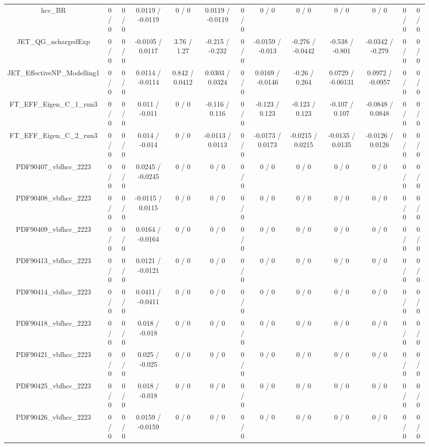 \documentclass[10pt]{article}
\begin{document}
\begin{table}[htbp]
\begin{center}
\begin{tabular}{|c|c|c|c|c|c|c|c|c|c|c|c|c|}
  hcc_BR & 0 / 0 & 0 / 0 & 0.0119 / -0.0119 & 0 / 0 & 0.0119 / -0.0119 & 0 / 0 & 0 / 0 & 0 / 0 & 0 / 0 & 0 / 0 & 0 / 0 & 0 / 0 \\ 
  JET_QG_nchargedExp & 0 / 0 & 0 / 0 & -0.0105 / 0.0117 & 3.76 / 1.27 & -0.215 / -0.232 & 0 / 0 & -0.0159 / -0.013 & -0.276 / -0.0442 & -0.538 / -0.801 & -0.0342 / -0.279 & 0 / 0 & 0 / 0 \\ 
  JET_EffectiveNP_Modelling1 & 0 / 0 & 0 / 0 & 0.0114 / -0.0114 & 0.842 / 0.0412 & 0.0303 / 0.0324 & 0 / 0 & 0.0169 / -0.0146 & -0.26 / 0.264 & 0.0729 / -0.00131 & 0.0972 / -0.0957 & 0 / 0 & 0 / 0 \\ 
  FT_EFF_Eigen_C_1_run3 & 0 / 0 & 0 / 0 & 0.011 / -0.011 & 0 / 0 & -0.116 / 0.116 & 0 / 0 & -0.123 / 0.123 & -0.123 / 0.123 & -0.107 / 0.107 & -0.0848 / 0.0848 & 0 / 0 & 0 / 0 \\ 
  FT_EFF_Eigen_C_2_run3 & 0 / 0 & 0 / 0 & 0.014 / -0.014 & 0 / 0 & -0.0113 / 0.0113 & 0 / 0 & -0.0173 / 0.0173 & -0.0215 / 0.0215 & -0.0135 / 0.0135 & -0.0126 / 0.0126 & 0 / 0 & 0 / 0 \\ 
  PDF90407_vbfhcc_2223 & 0 / 0 & 0 / 0 & 0.0245 / -0.0245 & 0 / 0 & 0 / 0 & 0 / 0 & 0 / 0 & 0 / 0 & 0 / 0 & 0 / 0 & 0 / 0 & 0 / 0 \\ 
  PDF90408_vbfhcc_2223 & 0 / 0 & 0 / 0 & -0.0115 / 0.0115 & 0 / 0 & 0 / 0 & 0 / 0 & 0 / 0 & 0 / 0 & 0 / 0 & 0 / 0 & 0 / 0 & 0 / 0 \\ 
  PDF90409_vbfhcc_2223 & 0 / 0 & 0 / 0 & 0.0164 / -0.0164 & 0 / 0 & 0 / 0 & 0 / 0 & 0 / 0 & 0 / 0 & 0 / 0 & 0 / 0 & 0 / 0 & 0 / 0 \\ 
  PDF90413_vbfhcc_2223 & 0 / 0 & 0 / 0 & 0.0121 / -0.0121 & 0 / 0 & 0 / 0 & 0 / 0 & 0 / 0 & 0 / 0 & 0 / 0 & 0 / 0 & 0 / 0 & 0 / 0 \\ 
  PDF90414_vbfhcc_2223 & 0 / 0 & 0 / 0 & 0.0411 / -0.0411 & 0 / 0 & 0 / 0 & 0 / 0 & 0 / 0 & 0 / 0 & 0 / 0 & 0 / 0 & 0 / 0 & 0 / 0 \\ 
  PDF90418_vbfhcc_2223 & 0 / 0 & 0 / 0 & 0.018 / -0.018 & 0 / 0 & 0 / 0 & 0 / 0 & 0 / 0 & 0 / 0 & 0 / 0 & 0 / 0 & 0 / 0 & 0 / 0 \\ 
  PDF90421_vbfhcc_2223 & 0 / 0 & 0 / 0 & 0.025 / -0.025 & 0 / 0 & 0 / 0 & 0 / 0 & 0 / 0 & 0 / 0 & 0 / 0 & 0 / 0 & 0 / 0 & 0 / 0 \\ 
  PDF90425_vbfhcc_2223 & 0 / 0 & 0 / 0 & 0.018 / -0.018 & 0 / 0 & 0 / 0 & 0 / 0 & 0 / 0 & 0 / 0 & 0 / 0 & 0 / 0 & 0 / 0 & 0 / 0 \\ 
  PDF90426_vbfhcc_2223 & 0 / 0 & 0 / 0 & 0.0159 / -0.0159 & 0 / 0 & 0 / 0 & 0 / 0 & 0 / 0 & 0 / 0 & 0 / 0 & 0 / 0 & 0 / 0 & 0 / 0 \\ 

\end{tabular}
\end{center}
\end{table}
\end{document}
